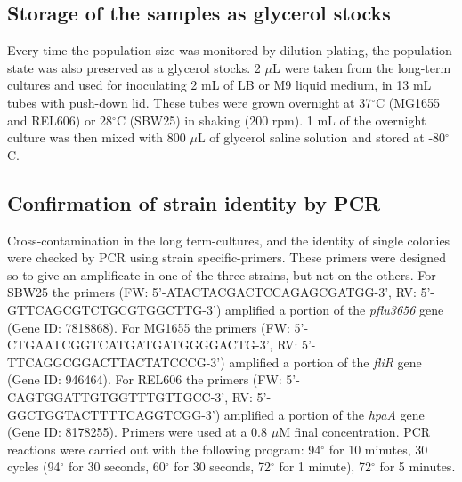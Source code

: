 \documentclass[
	11pt,
	a4paper,
]{article} %
\begin{document}
\begin{multicols}{2}
\subsection*{Storage of the samples as glycerol stocks}
Every time the population size was monitored by dilution plating, the population state was also preserved as a glycerol stocks.
2 $\mu$L were taken from the long-term cultures and used for inoculating 2 mL of LB or M9 liquid medium, in 13 mL tubes with push-down lid.
These tubes were grown overnight at 37$^\circ$C (MG1655 and REL606) or 28$^\circ$C (SBW25) in shaking (200 rpm).
1 mL of the overnight culture was then mixed with 800 $\mu$L of glycerol saline solution and stored at -80$^\circ$C.

\subsection*{Confirmation of strain identity by PCR}
Cross-contamination in the long term-cultures, and the identity of single colonies were checked by PCR using strain specific-primers.
These primers were designed so to give an amplificate in one of the three strains, but not on the others.
For SBW25 the primers (FW: 5’-ATACTACGACTCCAGAGCGATGG-3', RV: 5’-GTTCAGCGTCTGCGTGGCTTG-3') amplified a portion of the \textit{pflu3656} gene (Gene ID: 7818868).
For MG1655 the primers (FW: 5’-CTGAATCGGTCATGATGATGGGGACTG-3', RV: 5’-TTCAGGCGGACTTACTATCCCG-3') amplified a portion of the \textit{fliR} gene (Gene ID: 946464).
For REL606 the primers (FW: 5’-CAGTGGATTGTGGTTTGTTGCC-3', RV: 5’-GGCTGGTACTTTTCAGGTCGG-3') amplified a portion of the \textit{hpaA} gene (Gene ID: 8178255).
Primers were used at a 0.8 $\mu$M final concentration.
PCR reactions were carried out with the following program: 94$^\circ$ for 10 minutes, 30 cycles (94$^\circ$ for 30 seconds, 60$^\circ$ for 30 seconds, 72$^\circ$ for 1 minute), 72$^\circ$ for 5 minutes.

\footnotesize


\end{multicols}
\end{document}
